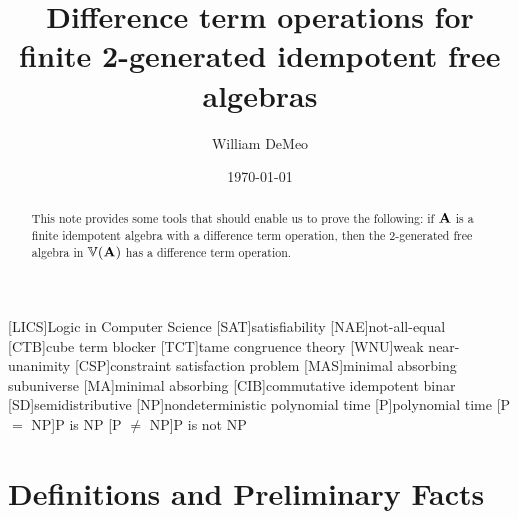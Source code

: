[LICS]{Logic in Computer Science}
[SAT]{satisfiability}
[NAE]{not-all-equal}
[CTB]{cube term blocker}
[TCT]{tame congruence theory}
[WNU]{weak near-unanimity}
[CSP]{constraint satisfaction problem}
[MAS]{minimal absorbing subuniverse}
[MA]{minimal absorbing}
[CIB]{commutative idempotent binar}
[SD]{semidistributive}
[NP]{nondeterministic polynomial time}
[P]{polynomial time}
[P $ = $ NP]{P is NP}
[P $ \neq $ NP]{P is not NP}





\usepackage{inputs/macros}



\title[Difference Term Operation for $\bF_{\sV}(2)$]
{Difference term operations for finite 2-generated idempotent free algebras}
\date{\today}
\author[W.~DeMeo]{William DeMeo}
\address{University of Hawaii}


\maketitle

\begin{abstract}
This note provides some tools that should enable us to prove
the following: if $\mathbf{A}$ is a finite idempotent algebra with a
difference term operation, then the 2-generated free algebra in $\operatorname{\mathbb{V}}(\mathbf{A})$ has
a difference term operation.  
\end{abstract}

\section{Definitions and Preliminary Facts}
\label{sec:facts}

